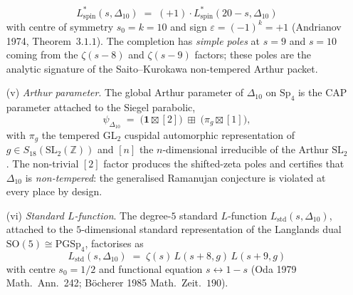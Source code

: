 \begin{proposition}
\begin{enumerate}
\[
 L^*_{\mathrm{spin}}(s, \Delta_{10}) \;=\; (+1) \cdot L^*_{\mathrm{spin}}(20 - s, \Delta_{10})
\]
with centre of symmetry $s_0 = k = 10$ and sign $\varepsilon = (-1)^k = +1$ \textup{(}Andrianov 1974, Theorem~$3.1.1$\textup{)}. The completion has \emph{simple poles} at $s = 9$ and $s = 10$ coming from the $\zeta(s-8)$ and $\zeta(s-9)$ factors; these poles are the analytic signature of the Saito--Kurokawa non-tempered Arthur packet.
\item[\textup{(v)}] \emph{Arthur parameter}. The global Arthur parameter of $\Delta_{10}$ on $\mathrm{Sp}_4$ is the CAP parameter attached to the Siegel parabolic,
\[
 \psi_{\Delta_{10}} \;=\; \bigl(\mathbf{1} \boxtimes [2]\bigr) \;\boxplus\; \bigl(\pi_g \boxtimes [1]\bigr),
\]
with $\pi_g$ the tempered GL$_2$ cuspidal automorphic representation of $g \in S_{18}(\mathrm{SL}_2(\mathbb{Z}))$ and $[n]$ the $n$-dimensional irreducible of the Arthur $\mathrm{SL}_2$. The non-trivial $[2]$ factor produces the shifted-zeta poles and certifies that $\Delta_{10}$ is \emph{non-tempered}: the generalised Ramanujan conjecture is violated at every place by design.
\item[\textup{(vi)}] \emph{Standard $L$-function}. The degree-$5$ standard $L$-function $L_{\mathrm{std}}(s, \Delta_{10})$, attached to the $5$-dimensional standard representation of the Langlands dual $\mathrm{SO}(5) \cong \mathrm{PGSp}_4$, factorises as
\[
 L_{\mathrm{std}}(s, \Delta_{10}) \;=\; \zeta(s)\, L(s + 8, g)\, L(s + 9, g)
\]
with centre $s_0 = 1/2$ and functional equation $s \leftrightarrow 1 - s$ \textup{(}Oda 1979 Math.\ Ann.~242\textup{;} B\"ocherer 1985 Math.\ Zeit.~$190$\textup{)}.
\end{enumerate}
\end{proposition}

